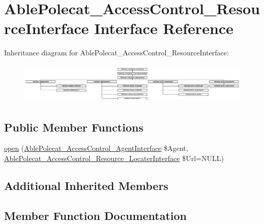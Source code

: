 \hypertarget{interface_able_polecat___access_control___resource_interface}{}\section{Able\+Polecat\+\_\+\+Access\+Control\+\_\+\+Resource\+Interface Interface Reference}
\label{interface_able_polecat___access_control___resource_interface}
Inheritance diagram for Able\+Polecat\+\_\+\+Access\+Control\+\_\+\+Resource\+Interface\+:\begin{figure}[H]
\begin{center}
\leavevmode
\includegraphics[height=1.951219cm]{interface_able_polecat___access_control___resource_interface}
\end{center}
\end{figure}
\subsection*{Public Member Functions}
\begin{DoxyCompactItemize}
\item 
\hyperlink{interface_able_polecat___access_control___resource_interface_aaba20e74dced7f11f018a5a86ead176e}{open} (\hyperlink{interface_able_polecat___access_control___agent_interface}{Able\+Polecat\+\_\+\+Access\+Control\+\_\+\+Agent\+Interface} \$Agent, \hyperlink{interface_able_polecat___access_control___resource___locater_interface}{Able\+Polecat\+\_\+\+Access\+Control\+\_\+\+Resource\+\_\+\+Locater\+Interface} \$Url=N\+U\+L\+L)
\end{DoxyCompactItemize}
\subsection*{Additional Inherited Members}


\subsection{Member Function Documentation}
\hypertarget{interface_able_polecat___access_control___resource_interface_aaba20e74dced7f11f018a5a86ead176e}{}
